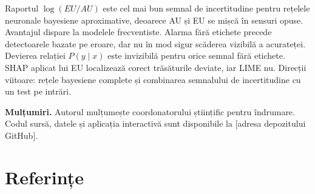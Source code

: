 \documentclass[12pt,a4paper]{article}
\begin{document}
Raportul \(\log(EU/AU)\) este cel mai bun semnal de incertitudine pentru
rețelele neuronale bayesiene aproximative, deoarece AU și EU se mișcă în
sensuri opuse. Avantajul dispare la modelele frecventiste. Alarma fără
etichete precede detectoarele bazate pe eroare, dar nu în mod sigur
scăderea vizibilă a acurateței. Devierea relației \(P(y\mid x)\) este
invizibilă pentru orice semnal fără etichete. SHAP aplicat lui EU
localizează corect trăsăturile deviate, iar LIME nu. Direcții viitoare:
rețele bayesiene complete și combinarea semnalului de incertitudine cu
un test pe intrări.

\textbf{Mulțumiri.} Autorul mulțumește coordonatorului științific pentru
îndrumare. Codul sursă, datele și aplicația interactivă sunt disponibile
la {[}adresa depozitului GitHub{]}.

\hypertarget{referinux21be}{%
\section{Referințe}\label{referinux21be}}
\end{document}
